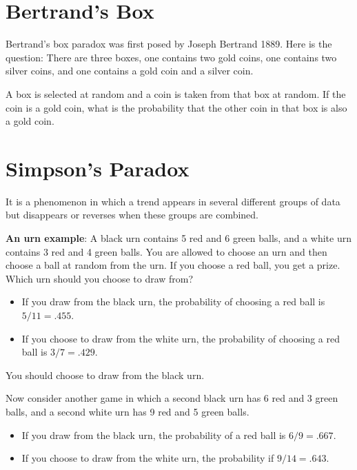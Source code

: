 \hypertarget{Bertrand-Box}{%
\section{Bertrand's Box}\label{Bertrand-Box}}

Bertrand's box paradox was first posed by Joseph Bertrand 1889. Here is the
question: There are three boxes, one contains two gold coins, one contains two
silver coins, and one contains a gold coin and a silver coin.

A box is selected at random and a coin is taken from that box at random. If the
coin is a gold coin, what is the probability that the other coin in that box is
also a gold coin.




\hypertarget{simpsons-paradox}{%
\section{Simpson's Paradox}\label{simpsons-paradox}}

It is a phenomenon in which a trend appears in several different
groups of data but disappears or reverses when these groups are
combined.

\textbf{An urn example}: A black urn contains 5 red and 6 green balls,
and a white urn contains 3 red and 4 green balls. You are allowed to
choose an urn and then choose a ball at random from the urn. If you
choose a red ball, you get a prize. Which urn should you choose to
draw from?

\begin{itemize}
\item If you draw from the black urn, the probability of choosing a
  red ball is $5/11 = .455$.
\item If you choose to draw from the white urn, the probability of
  choosing a red ball is $3/7 = .429$.
\end{itemize}

You should choose to draw from the black urn.

Now consider another game in which a second black urn has 6 red and
3 green balls, and a second white urn has 9 red and 5 green balls.

\begin{itemize}
\item If you draw from the black urn, the probability of a red ball is
  $6/9 = .667$.
\item If you choose to draw from the white urn, the probability if
  $9/14 = .643$.
\end{itemize}

